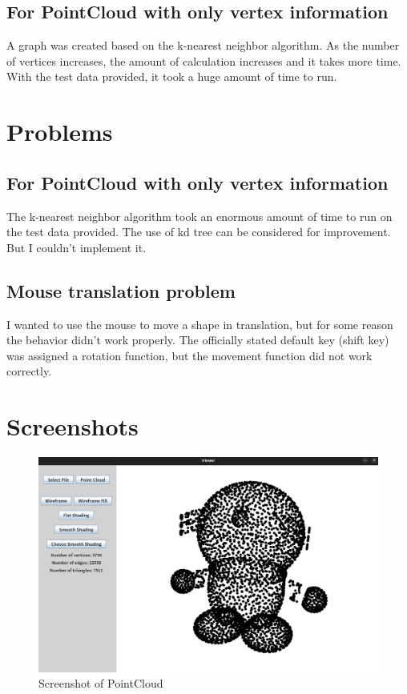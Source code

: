 \documentclass[12pt]{article}
\begin{document}
\subsection{For PointCloud with only vertex information}
A graph was created based on the k-nearest neighbor algorithm. As the number of
vertices increases, the amount of calculation increases and it takes more time.
With the test data provided, it took a huge amount of time to run.

\section{Problems}
\subsection{For PointCloud with only vertex information}
The k-nearest neighbor algorithm took an enormous amount of time to run on the
test data provided.
The use of kd tree can be considered for improvement. But I couldn't implement
it.

\subsection{Mouse translation problem}
I wanted to use the mouse to move a shape in translation, but for some reason
the
behavior didn't work properly. The officially stated default key (shift key)
was assigned a rotation function, but the movement function did not work
correctly.

\section{Screenshots}
\begin{figure}[h]
    \centering
    \includegraphics[width=1.0\textwidth]{sc1.png}
    \caption{Screenshot of PointCloud}
    \label{fig:my_label}
\end{figure}
\end{document}
